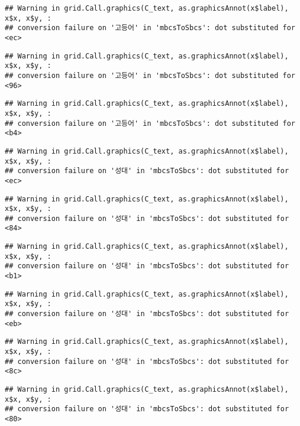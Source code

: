 \documentclass[
]{article}
\begin{document}
\begin{verbatim}
## Warning in grid.Call.graphics(C_text, as.graphicsAnnot(x$label), x$x, x$y, :
## conversion failure on '고등어' in 'mbcsToSbcs': dot substituted for <ec>
\end{verbatim}

\begin{verbatim}
## Warning in grid.Call.graphics(C_text, as.graphicsAnnot(x$label), x$x, x$y, :
## conversion failure on '고등어' in 'mbcsToSbcs': dot substituted for <96>
\end{verbatim}

\begin{verbatim}
## Warning in grid.Call.graphics(C_text, as.graphicsAnnot(x$label), x$x, x$y, :
## conversion failure on '고등어' in 'mbcsToSbcs': dot substituted for <b4>
\end{verbatim}

\begin{verbatim}
## Warning in grid.Call.graphics(C_text, as.graphicsAnnot(x$label), x$x, x$y, :
## conversion failure on '성대' in 'mbcsToSbcs': dot substituted for <ec>
\end{verbatim}

\begin{verbatim}
## Warning in grid.Call.graphics(C_text, as.graphicsAnnot(x$label), x$x, x$y, :
## conversion failure on '성대' in 'mbcsToSbcs': dot substituted for <84>
\end{verbatim}

\begin{verbatim}
## Warning in grid.Call.graphics(C_text, as.graphicsAnnot(x$label), x$x, x$y, :
## conversion failure on '성대' in 'mbcsToSbcs': dot substituted for <b1>
\end{verbatim}

\begin{verbatim}
## Warning in grid.Call.graphics(C_text, as.graphicsAnnot(x$label), x$x, x$y, :
## conversion failure on '성대' in 'mbcsToSbcs': dot substituted for <eb>
\end{verbatim}

\begin{verbatim}
## Warning in grid.Call.graphics(C_text, as.graphicsAnnot(x$label), x$x, x$y, :
## conversion failure on '성대' in 'mbcsToSbcs': dot substituted for <8c>
\end{verbatim}

\begin{verbatim}
## Warning in grid.Call.graphics(C_text, as.graphicsAnnot(x$label), x$x, x$y, :
## conversion failure on '성대' in 'mbcsToSbcs': dot substituted for <80>
\end{verbatim}
\end{document}
